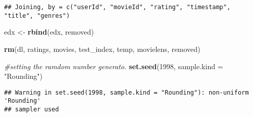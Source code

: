 \documentclass[]{article}
\newenvironment{Shaded}{\begin{snugshade}}{\end{snugshade}}
\newcommand{\CommentTok}[1]{\textcolor[rgb]{0.56,0.35,0.01}{\textit{#1}}}
\newcommand{\DataTypeTok}[1]{\textcolor[rgb]{0.13,0.29,0.53}{#1}}
\newcommand{\DecValTok}[1]{\textcolor[rgb]{0.00,0.00,0.81}{#1}}
\newcommand{\FloatTok}[1]{\textcolor[rgb]{0.00,0.00,0.81}{#1}}
\newcommand{\KeywordTok}[1]{\textcolor[rgb]{0.13,0.29,0.53}{\textbf{#1}}}
\newcommand{\NormalTok}[1]{#1}
\newcommand{\OperatorTok}[1]{\textcolor[rgb]{0.81,0.36,0.00}{\textbf{#1}}}
\newcommand{\OtherTok}[1]{\textcolor[rgb]{0.56,0.35,0.01}{#1}}
\newcommand{\StringTok}[1]{\textcolor[rgb]{0.31,0.60,0.02}{#1}}
\begin{document}
\begin{Shaded}
\end{Shaded}

\begin{verbatim}
## Joining, by = c("userId", "movieId", "rating", "timestamp", "title", "genres")
\end{verbatim}

\begin{Shaded}
\begin{Highlighting}[]
\NormalTok{edx <-}\StringTok{ }\KeywordTok{rbind}\NormalTok{(edx, removed)}

\KeywordTok{rm}\NormalTok{(dl, ratings, movies, test_index, temp, movielens, removed)}

\CommentTok{#setting the ramdom number generato.}
\KeywordTok{set.seed}\NormalTok{(}\DecValTok{1998}\NormalTok{, }\DataTypeTok{sample.kind =} \StringTok{"Rounding"}\NormalTok{) }
\end{Highlighting}
\end{Shaded}

\begin{verbatim}
## Warning in set.seed(1998, sample.kind = "Rounding"): non-uniform 'Rounding'
## sampler used
\end{verbatim}
\end{document}
